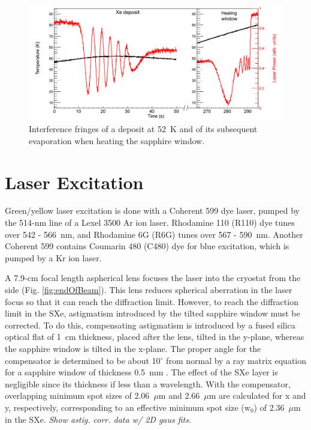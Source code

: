 \begin{figure} %
        \centering
                \includegraphics[width=.9\textwidth]{figures/fringes_dep_and_melt.png}
                \caption{Interference fringes of a deposit at 52~K and of its subsequent evaporation when heating the sapphire window.}
\label{fig:fringes_melt_withDep}
\end{figure}

\section{Laser Excitation}

Green/yellow laser excitation is done with a Coherent 599 dye laser, pumped by the 514-nm line of a Lexel 3500 Ar ion laser.  Rhodamine 110 (R110) dye tunes over 542 - 566~nm, and Rhodamine 6G (R6G) tunes over 567 - 590~nm.  Another Coherent 599 contains Coumarin 480 (C480) dye for blue excitation, which is pumped by a Kr ion laser.

A 7.9-cm focal length aspherical lens focuses the laser into the cryostat from the side (Fig. \ref{fig:endOfBeam}).  This lens reduces spherical aberration in the laser focus so that it can reach the diffraction limit.  However, to reach the diffraction limit in the SXe, astigmatism introduced by the tilted sapphire window must be corrected.  To do this, compensating astigmatism is introduced by a fused silica optical flat of 1~cm thickness, placed after the lens, tilted in the y-plane, whereas the sapphire window is tilted in the x-plane.  The proper angle for the compensator is determined to be about 10$^{\circ}$ from normal by a ray matrix equation for a sapphire window of thickness 0.5~mm \cite{raymatrix}.  The effect of the SXe layer is negligible since its thickness if less than a wavelength.  With the compensator, overlapping minimum spot sizes of 2.06~$\mu$m and 2.66~$\mu$m are calculated for x and y, respectively, corresponding to an effective minimum spot size (w$_{0}$) of 2.36~$\mu$m in the SXe.  \emph{\color{gray}Show astig. corr. data w/ 2D gaus fits.}

